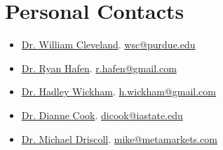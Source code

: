 \documentclass[oneside]{article}
\begin{document}
\newpage
\section{Personal Contacts}

  \begin{itemize}
  
    \item \href{http://www.stat.purdue.edu/~wsc/}{Dr. William Cleveland}. \href{mailto:wsc@purdue.edu}{wsc@purdue.edu}

    \item \href{https://www.linkedin.com/profile/view?id=47227110}{Dr. Ryan Hafen}. \href{mailto:r.hafen@gmail.com}{r.hafen@gmail.com}

    \item \href{http://had.co.nz/}{Dr. Hadley Wickham}.  \href{mailto:h.wickham@gmail.com}{h.wickham@gmail.com}

    \item \href{http://dicook.github.io/}{Dr. Dianne Cook}.  \href{mailto:dicook@iastate.edu}{dicook@iastate.edu}

    \item \href{https://www.linkedin.com/profile/view?id=413949}{Dr. Michael Driscoll}. \href{mailto:mike@metamarkets.com}{mike@metamarkets.com}

  \end{itemize}
  
\end{document}
